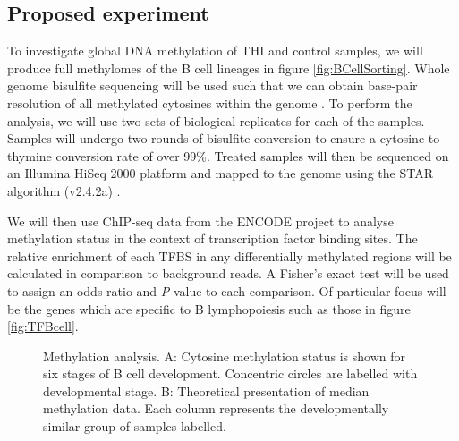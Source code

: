 \documentclass[12pt]{article}
\begin{document}
		\subsection{Proposed experiment}
		
			To investigate global DNA methylation of THI and control samples, we will produce full methylomes of the B cell lineages in figure \ref{fig:BCellSorting}. 
			Whole genome bisulfite sequencing will be used such that we can obtain base-pair resolution of all methylated cytosines within the genome \citep{Kulis15,Oakes16}. 
			To perform the analysis, we will use two sets of biological replicates for each of the samples. 
			Samples will undergo two rounds of bisulfite conversion to ensure a cytosine to thymine conversion rate of over 99\%.
			Treated samples will then be sequenced on an Illumina HiSeq 2000 platform and mapped to the genome using the STAR algorithm (v2.4.2a) \citep{Dobin13}.
			
			We will then use ChIP-seq data from the ENCODE project \citep{ENCODE-Project-Consortium12} to analyse methylation status in the context of transcription factor binding sites.
			The relative enrichment of each TFBS in any differentially methylated regions will be calculated in comparison to background reads. 
			A Fisher's exact test will be used to assign an odds ratio and \textit{P} value to each comparison. 
			Of particular focus will be the genes which are specific to B lymphopoiesis such as those in figure \ref{fig:TFBcell}.

\begin{figure}[tb]
	\centering
		\caption{Methylation analysis. A: Cytosine methylation status is shown for six stages of B cell development. Concentric circles are labelled with developmental stage.  B: Theoretical presentation of median methylation data. Each column represents the developmentally similar group of samples labelled.}
		\label{fig:TheoPlots}
	\end{figure}
			
\end{document}
